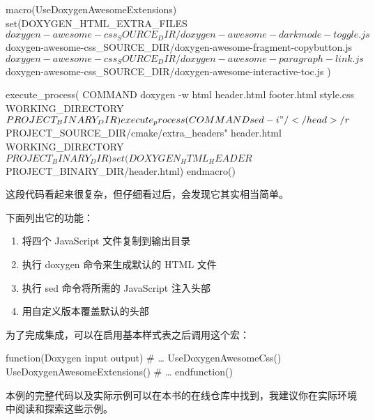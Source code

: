 
\begin{cmake}
macro(UseDoxygenAwesomeExtensions)
    set(DOXYGEN_HTML_EXTRA_FILES
        ${doxygen-awesome-css_SOURCE_DIR}/doxygen-awesome-darkmode-toggle.js
        ${doxygen-awesome-css_SOURCE_DIR}/doxygen-awesome-fragment-copybutton.js
        ${doxygen-awesome-css_SOURCE_DIR}/doxygen-awesome-paragraph-link.js
        ${doxygen-awesome-css_SOURCE_DIR}/doxygen-awesome-interactive-toc.js
    )

    execute_process(
        COMMAND doxygen -w html header.html footer.html style.css
        WORKING_DIRECTORY ${PROJECT_BINARY_DIR}
    )
    execute_process(
        COMMAND sed -i
        "/<\\/head>/r ${PROJECT_SOURCE_DIR}/cmake/extra_headers"
        header.html
        WORKING_DIRECTORY ${PROJECT_BINARY_DIR}
    )
    set(DOXYGEN_HTML_HEADER ${PROJECT_BINARY_DIR}/header.html)
endmacro()
\end{cmake}

这段代码看起来很复杂，但仔细看过后，会发现它其实相当简单。

下面列出它的功能：

\begin{enumerate}
\item
将四个 JavaScript 文件复制到输出目录

\item
执行 doxygen 命令来生成默认的 HTML 文件

\item
执行 sed 命令将所需的 JavaScript 注入头部

\item
用自定义版本覆盖默认的头部
\end{enumerate}

为了完成集成，可以在启用基本样式表之后调用这个宏：


\begin{cmake}
function(Doxygen input output)
# …
    UseDoxygenAwesomeCss()
    UseDoxygenAwesomeExtensions()
# …
endfunction()
\end{cmake}

本例的完整代码以及实际示例可以在本书的在线仓库中找到，我建议你在实际环境中阅读和探索这些示例。

